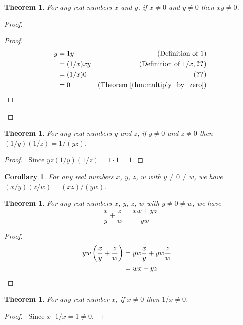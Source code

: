 \documentclass{book}
\let\qed\relax
\newtheorem{cor}{Corollary}[ax]
\newtheorem{thm}[ax]{Theorem}
\theoremstyle{definition}
\begin{document}
\begin{thm}
For any real numbers $x$ and $y$, if $x \neq 0$ and $y \neq 0$ then $xy \neq 0$.
\end{thm}

\begin{proof}
\pf
{}
\begin{proof}
	\pf
	\begin{align*}
		y & = 1y & (\text{Definition of } 1) \\
		& = (1/x)xy & (\text{Definition of } 1/x, \text{\stepref{2}}) \\
		& = (1/x)0 & (\text{\stepref{2}}) \\
		& = 0 & (\text{Theorem \ref{thm:multiply_by_zero}})
	\end{align*}
\end{proof}
\qed
\end{proof}

\begin{thm}
For any real numbers $y$ and $z$, if $y \neq 0$ and $z \neq 0$ then $(1/y)(1/z) = 1/(yz)$.
\end{thm}

\begin{proof}
\pf\ Since $yz(1/y)(1/z) = 1 \cdot 1 = 1$. \qed
\end{proof}

\begin{cor}
For any real numbers $x$, $y$, $z$, $w$ with $y \neq 0 \neq w$, we have $(x/y)(z/w) = (xz)/(yw)$.
\end{cor}

\begin{thm}
For any real numbers $x$, $y$, $z$, $w$ with $y \neq 0 \neq w$, we have
\[ \frac{x}{y} + \frac{z}{w} = \frac{xw + yz}{yw} \]
\end{thm}

\begin{proof}
\pf
\begin{align*}
yw \left( \frac{x}{y} + \frac{z}{w} \right)
& = y w \frac{x}{y} + yw \frac{z}{w} \\
& = wx + yz & \qed
\end{align*}
\end{proof}

\begin{thm}
For any real number $x$, if $x \neq 0$ then $1/x \neq 0$.
\end{thm}

\begin{proof}
\pf\ Since $x \cdot 1/x = 1 \neq 0$. \qed
\end{proof}
\end{document}

